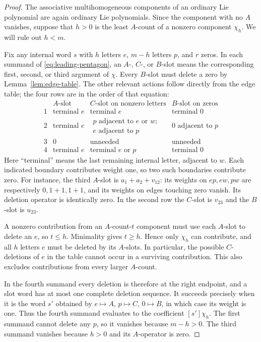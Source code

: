 \begin{proof}
The associative multihomogeneous components of an ordinary Lie
polynomial are again ordinary Lie polynomials.  Since the component
with no $A$ vanishes, suppose that $h>0$ is the least $A$-count of a
nonzero component $\chi_h$.  We will rule out $h<m$.

Fix any internal word $s$ with $h$ letters $e$, $m-h$ letters $p$, and
$r$ zeros.  In each summand of \eqref{eq:leading-pentagon}, an
$A$-, $C$-, or $B$-slot means the corresponding first, second, or third
argument of $\chi$.  Every $B$-slot must delete a zero by
Lemma~\ref{lem:edge-table}.  The other relevant actions follow directly
from the edge table; the four rows are in the order of that equation:
\begin{equation}\label{eq:deletion-slot-actions}
\begin{array}{c|c|c|c}
 &A\text{-slot}&C\text{-slot on nonzero letters}&B\text{-slot on zeros}\\ \hline
1&\text{terminal }e&\text{terminal }e&\text{terminal }0\\
2&\text{terminal }e&
 \substack{p\text{ adjacent to }e\text{ or }w;\\
             e\text{ adjacent to }p}&0\text{ adjacent to }p\\
3&0&\text{unneeded}&\text{unneeded}\\
4&\text{terminal }e&\text{terminal }e\text{ or }p&\text{terminal }0
\end{array}
\end{equation}
Here ``terminal'' means the last remaining internal letter, adjacent to
$w$.  Each indicated boundary contributes weight one, so two such
boundaries contribute zero.  For instance, the third $A$-slot is
$a_1+a_2+v_{12}$: its weights on $ep,ew,pw$ are respectively
$0,1+1,1+1$, and its weights on edges touching zero vanish.  Its deletion
operator is identically zero.  In the second row the $C$-slot is
$v_{23}$ and the $B$-slot is $u_{23}$.

A nonzero contribution from an $A$-count-$t$ component must use each
$A$-slot to delete an $e$, so $t\leq h$.  Minimality gives $t\geq h$.
Hence only $\chi_h$ can contribute, and all $h$ letters $e$ must be
deleted by its $A$-slots.  In particular, the possible $C$-deletions of
$e$ in the table cannot occur in a surviving contribution.  This also
excludes contributions from every larger $A$-count.

In the fourth summand every deletion is therefore at the right
endpoint, and a slot word has at most one complete deletion sequence.
It succeeds precisely when it is the word $s'$ obtained by
$e\mapsto A$, $p\mapsto C$, $0\mapsto B$, in which case its weight is
one.  Thus the fourth summand evaluates to the coefficient $[s']\chi_h$.
The first summand cannot delete any $p$, so it vanishes because
$m-h>0$.  The third summand vanishes because $h>0$ and its $A$-operator
is zero.


\end{proof}
